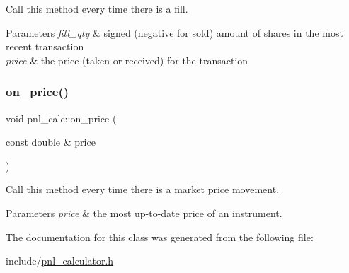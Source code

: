Call this method every time there is a fill. 


\begin{DoxyParams}{Parameters}
{\em fill\+\_\+qty} & signed (negative for sold) amount of shares in the most recent transaction \\
\hline
{\em price} & the price (taken or received) for the transaction \\
\hline
\end{DoxyParams}
\mbox{\label{classpnl__calc_aa8fe2e20c0520c17dbba6a37066f2b9c}} 
\subsubsection{\texorpdfstring{on\+\_\+price()}{on\_price()}}
{\footnotesize\ttfamily void pnl\+\_\+calc\+::on\+\_\+price (\begin{DoxyParamCaption}\item[{const double \&}]{price }\end{DoxyParamCaption})}



Call this method every time there is a market price movement. 


\begin{DoxyParams}{Parameters}
{\em price} & the most up-\/to-\/date price of an instrument. \\
\hline
\end{DoxyParams}


The documentation for this class was generated from the following file\+:\begin{DoxyCompactItemize}
\item 
include/\hyperlink{pnl__calculator_8h}{pnl\+\_\+calculator.\+h}\end{DoxyCompactItemize}
